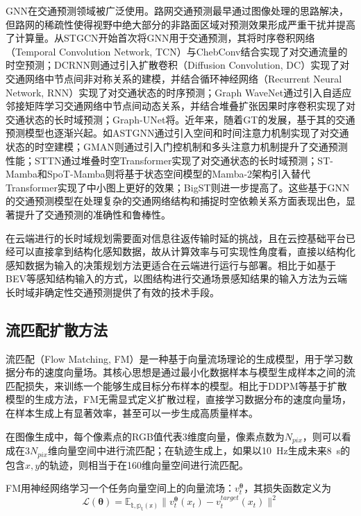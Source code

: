       GNN在交通预测领域被广泛使用。路网交通预测最早通过图像处理的思路解决，但路网的稀疏性使得视野中绝大部分的非路面区域对预测效果形成严重干扰并提高了计算量。从STGCN\cite{STGCN2018}开始首次将GNN用于交通预测，其将时序卷积网络（Temporal Convolution Network, TCN）与ChebConv结合实现了对交通流量的时空预测；DCRNN\cite{DCRNN2018}则通过引入扩散卷积（Diffusion Convolution, DC）实现了对交通网络中节点间非对称关系的建模，并结合循环神经网络（Recurrent Neural Network, RNN）实现了对交通状态的时序预测；Graph WaveNet\cite{GraphWaveNet2019}通过引入自适应邻接矩阵学习交通网络中节点间动态关系，并结合堆叠扩张因果时序卷积实现了对交通状态的长时域预测；Graph-UNet\cite{U_net_TrafficPred2022}将。近年来，随着GT的发展，基于其的交通预测模型也逐渐兴起。如ASTGNN\cite{ASTGCN2019}通过引入空间和时间注意力机制实现了对交通状态的时空建模；GMAN\cite{GMAN2019}则通过引入门控机制和多头注意力机制提升了交通预测性能；STTN\cite{STTN2021}通过堆叠时空Transformer实现了对交通状态的长时域预测；ST-Mamba\cite{ST_Mamba2024}和SpoT-Mamba\cite{SpoT_Mamba2024}则将基于状态空间模型的Mamba-2\cite{Mamba2_2024}架构引入替代Transformer实现了中小图上更好的效果；BigST\cite{BigST2024}则进一步提高了。这些基于GNN的交通预测模型在处理复杂的交通网络结构和捕捉时空依赖关系方面表现出色，显著提升了交通预测的准确性和鲁棒性。
      
      在云端进行的长时域规划需要面对信息往返传输时延的挑战，且在云控基础平台已经可以直接拿到结构化感知数据，故从计算效率与可实现性角度看，直接以结构化感知数据为输入的决策规划方法更适合在云端进行运行与部署。相比于如基于BEV等感知结构输入的方式\cite{li2024bev_planner}，以图结构进行交通场景感知结果的输入方法为云端长时域非确定性交通预测提供了有效的技术手段。

  \subsection{流匹配扩散方法}
      流匹配（Flow Matching, FM）是一种基于向量流场理论的生成模型，用于学习数据分布的速度向量场。其核心思想是通过最小化数据样本与模型生成样本之间的流匹配损失，来训练一个能够生成目标分布样本的模型\cite{FlowMatching2023original}。相比于DDPM等基于扩散模型的生成方法，FM无需显式定义扩散过程，直接学习数据分布的速度向量场，在样本生成上有显著效率，甚至可以一步生成高质量样本\cite{GoalFlow2025}。

      在图像生成中，每个像素点的RGB值代表3维度向量，像素点数为$N_{pix}$，则可以看成在$3 N_{pix}$维向量空间中进行流匹配；在轨迹生成上，如果以\SI{10}{Hz}生成未来\SI{8}{s}的包含$x,y$的轨迹，则相当于在160维向量空间进行流匹配。

      FM用神经网络学习一个任务向量空间上的向量流场：$v_t^\bm{\theta}$，其损失函数定义为
      \begin{equation}
      \mathcal{L}(\bm{\theta}) = \mathbb{E_{t,p_t(x)}} \lVert v_t^\bm{\theta}(x_t) - v_t^{target}(x_t) \rVert^2
      \label{eq:fm_loss_original}
      \end{equation}

